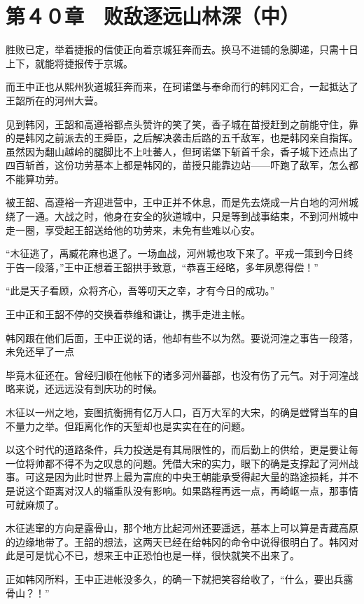 \section{第４０章　败敌逐远山林深（中）}

胜败已定，举着捷报的信使正向着京城狂奔而去。换马不进铺的急脚递，只需十日上下，就能将捷报传于京城。

而王中正也从熙州狄道城狂奔而来，在珂诺堡与奉命而行的韩冈汇合，一起抵达了王韶所在的河州大营。

见到韩冈，王韶和高遵裕都点头赞许的笑了笑，香子城在苗授赶到之前能守住，靠的是韩冈之前派去的王舜臣，之后解决袭击后路的五千敌军，也是韩冈亲自指挥。虽然因为翻山越岭的腿脚比不上吐蕃人，但珂诺堡下斩首千余，香子城下还点出了四百斩首，这份功劳基本上都是韩冈的，苗授只能靠边站——吓跑了敌军，怎么都不能算功劳。

被王韶、高遵裕一齐迎进营中，王中正并不休息，而是先去烧成一片白地的河州城绕了一通。大战之时，他身在安全的狄道城中，只是等到战事结束，不到河州城中走一圈，享受起王韶送给他的功劳来，未免有些难以心安。

“木征逃了，禹臧花麻也退了。一场血战，河州城也攻下来了。平戎一策到今日终于告一段落，”王中正想着王韶拱手致意，“恭喜王经略，多年夙愿得偿！”

“此是天子看顾，众将齐心，吾等叨天之幸，才有今日的成功。”

王中正和王韶不停的交换着恭维和谦让，携手走进主帐。

韩冈跟在他们后面，王中正说的话，他却有些不以为然。要说河湟之事告一段落，未免还早了一点

毕竟木征还在。曾经归顺在他帐下的诸多河州蕃部，也没有伤了元气。对于河湟战略来说，还远远没有到庆功的时候。

木征以一州之地，妄图抗衡拥有亿万人口，百万大军的大宋，的确是螳臂当车的自不量力之举。但距离化作的天堑却也是实实在在的问题。

以这个时代的道路条件，兵力投送是有其局限性的，而后勤上的供给，更是要让每一位将帅都不得不为之叹息的问题。凭借大宋的实力，眼下的确是支撑起了河州战事。可这是因为此时世界上最为富庶的中央王朝能承受得起大量的路途损耗，并不是说这个距离对汉人的辎重队没有影响。如果路程再远一点，再崎岖一点，那事情可就麻烦了。

木征逃窜的方向是露骨山，那个地方比起河州还要遥远，基本上可以算是青藏高原的边缘地带了。王韶的想法，这两天已经在给韩冈的命令中说得很明白了。韩冈对此是可是忧心不已，想来王中正恐怕也是一样，很快就笑不出来了。

正如韩冈所料，王中正进帐没多久，的确一下就把笑容给收了，“什么，要出兵露骨山？！”

